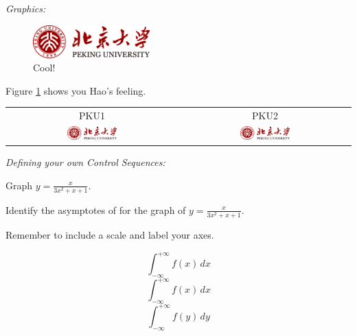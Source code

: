 \documentclass[12pt]{article}
\def\eq1{$y=\frac{x}{3x^2+x+1}$}
\def\labelaxes{Remember to include a scale and label your axes.}
\newcommand{\inftyint}{\int_{-\infty}^{+\infty}}
\newcommand{\intwrtx}[1]{\int_{-\infty}^{+\infty} #1 \,dx}
\newcommand{\intwrt}[2]{\int_{-\infty}^{+\infty} #2 \,d #1}
\begin{document}
\noindent
\begin{large}\textit{Graphics:}\end{large}

\begin{figure}[htbp]
\centering
\includegraphics[height=0.5in, angle = 30]{pku.png}
\caption{Cool!}
\label{fig:pku}
\end{figure}
Figure \ref{fig:pku} shows you Hao's feeling. \\

\begin{table}[h]
\begin{center}
\begin{tabular}{cc}
PKU1 & PKU2 \\
\includegraphics[width=0.3\textwidth]{pku.png} &
\includegraphics[width=0.3\textwidth]{pku.png} \\
\end{tabular}
\end{center}
\end{table}

\noindent
\begin{large}\textit{Defining your own Control Sequences:}\end{large}

Graph \eq1.

Identify the asymptotes of for the graph of \eq1. 

\labelaxes

\[ \inftyint f(x)\,dx \]
\[ \intwrtx{f(x)} \]
\[ \intwrt{y}{f(y)} \]
\end{document}
